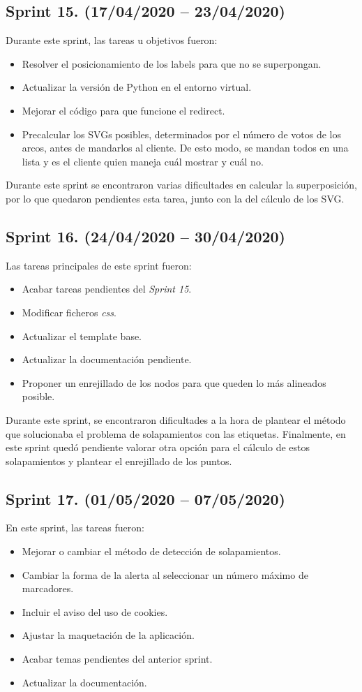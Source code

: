 \subsection{Sprint 15. (17/04/2020 -- 23/04/2020)}
Durante este sprint, las tareas u objetivos fueron:
\begin{itemize}
	\item Resolver el posicionamiento de los labels para que no se superpongan.
	\item Actualizar la versión de Python en el entorno virtual.
	\item Mejorar el código para que funcione el redirect.
	\item Precalcular los SVGs posibles, determinados por el número de votos de los arcos, antes de mandarlos al cliente. De esto modo, se mandan todos en una lista y es el cliente quien maneja cuál mostrar y cuál no.
\end{itemize}
Durante este sprint se encontraron varias dificultades en calcular la superposición, por lo que quedaron pendientes esta tarea, junto con la del cálculo de los SVG.

\subsection{Sprint 16. (24/04/2020 -- 30/04/2020)}
Las tareas principales de este sprint fueron:
\begin{itemize}
	\item Acabar tareas pendientes del \textit{Sprint 15}.
	\item Modificar ficheros \textit{css}.
	\item Actualizar el template base.
	\item Actualizar la documentación pendiente.
	\item Proponer un enrejillado de los nodos para que queden lo más alineados posible.
\end{itemize}
Durante este sprint, se encontraron dificultades a la hora de plantear el método que solucionaba el problema de solapamientos con las etiquetas. Finalmente, en este sprint quedó pendiente valorar otra opción para el cálculo de estos solapamientos y plantear el enrejillado de los puntos.

\subsection{Sprint 17. (01/05/2020 -- 07/05/2020)}
En este sprint, las tareas fueron:
\begin{itemize}
	\item Mejorar o cambiar el método de detección de solapamientos.
	\item Cambiar la forma de la alerta al seleccionar un número máximo de marcadores.
	\item Incluir el aviso del uso de cookies.
	\item Ajustar la maquetación de la aplicación.
	\item Acabar temas pendientes del anterior sprint.
	\item Actualizar la documentación.
\end{itemize}

